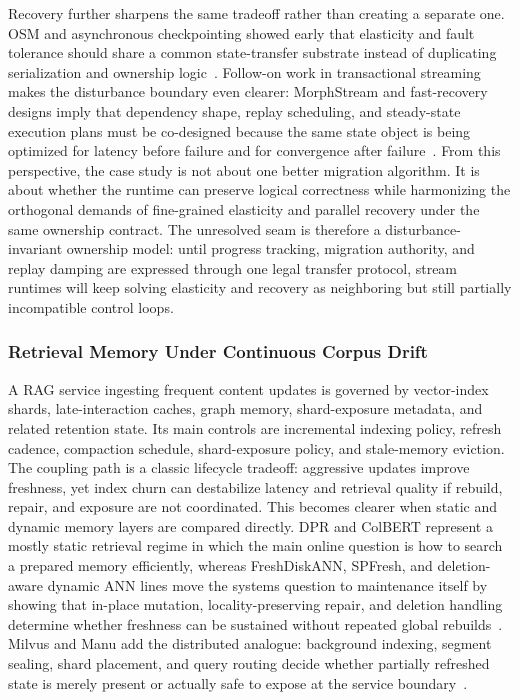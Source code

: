 \documentclass[acmsmall,screen,review]{acmart}
\begin{document}
Recovery further sharpens the same tradeoff rather than creating a separate one. OSM and asynchronous checkpointing showed early that elasticity and fault tolerance should share a common state-transfer substrate instead of duplicating serialization and ownership logic~\cite{fernandez2013osm,carbone2015asynchronous}. Follow-on work in transactional streaming makes the disturbance boundary even clearer: MorphStream and fast-recovery designs imply that dependency shape, replay scheduling, and steady-state execution plans must be co-designed because the same state object is being optimized for latency before failure and for convergence after failure~\cite{mao2023morphstream,zhao2024recovery}. From this perspective, the case study is not about one better migration algorithm. It is about whether the runtime can preserve logical correctness while harmonizing the orthogonal demands of fine-grained elasticity and parallel recovery under the same ownership contract. The unresolved seam is therefore a disturbance-invariant ownership model: until progress tracking, migration authority, and replay damping are expressed through one legal transfer protocol, stream runtimes will keep solving elasticity and recovery as neighboring but still partially incompatible control loops.

\subsubsection{Retrieval Memory Under Continuous Corpus Drift}

A RAG service ingesting frequent content updates is governed by vector-index shards, late-interaction caches, graph memory, shard-exposure metadata, and related retention state. Its main controls are incremental indexing policy, refresh cadence, compaction schedule, shard-exposure policy, and stale-memory eviction. The coupling path is a classic lifecycle tradeoff: aggressive updates improve freshness, yet index churn can destabilize latency and retrieval quality if rebuild, repair, and exposure are not coordinated. This becomes clearer when static and dynamic memory layers are compared directly. DPR and ColBERT represent a mostly static retrieval regime in which the main online question is how to search a prepared memory efficiently, whereas FreshDiskANN, SPFresh, and deletion-aware dynamic ANN lines move the systems question to maintenance itself by showing that in-place mutation, locality-preserving repair, and deletion handling determine whether freshness can be sustained without repeated global rebuilds~\cite{karpukhin2020dpr,khattab2020colbert,singh2021freshdiskann,xu2023spfresh,xu2025place}. Milvus and Manu add the distributed analogue: background indexing, segment sealing, shard placement, and query routing decide whether partially refreshed state is merely present or actually safe to expose at the service boundary~\cite{wang2021milvus,guo2022manu}.
\end{document}
